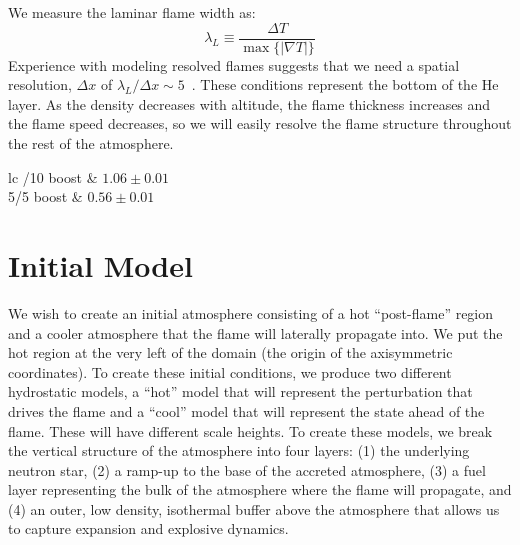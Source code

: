 \documentclass[trackchanges,preprint,times,tighten]{aastex63}
\begin{document}
We measure the laminar flame width as:
\begin{equation}
\lambda_L \equiv \frac{\Delta T}{\max\{|\nabla T|\}}
\end{equation}
Experience with modeling resolved flames suggests that we need a
spatial resolution, $\Delta x$ of $\lambda_L/\Delta x \sim 5$~\citep{SNld}.  These
conditions represent the bottom of the He layer.  As the density
decreases with altitude, the flame thickness increases and the flame
speed decreases, so we will easily resolve the flame structure throughout
the rest of the atmosphere.

\begin{deluxetable}{lc}
	/10 boost & $1.06 \pm 0.01$ \\
	5/5 boost & $0.56 \pm 0.01$ \\
	\enddata
\end{deluxetable}

\section{Initial Model}\label{Sec:inital_model}


We wish to create an initial atmosphere consisting of a hot
``post-flame'' region and a cooler atmosphere that the flame will
laterally propagate into.  We put the hot region at the very left of
the domain (the origin of the axisymmetric coordinates).  To create
these initial conditions, we produce two different hydrostatic models,
a ``hot'' model that will represent the perturbation that drives the
flame and a ``cool'' model that will represent the state ahead of the
flame.  These will have different scale heights.  To create these
models, we break the vertical structure of the atmosphere into four
layers: (1) the underlying neutron star, (2) a ramp-up to the base of the
accreted atmosphere, (3) a fuel layer representing the bulk of the
atmosphere where the flame will propagate, and (4) an outer, low density,
isothermal buffer above the atmosphere that allows us
to capture expansion and explosive dynamics.  
\end{document}
